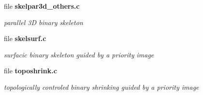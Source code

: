 \begin{CompactItemize}
\item 
file {\bf skelpar3d\_\-others.c}
\begin{CompactList}\small\item\em parallel 3D binary skeleton \item\end{CompactList}

\item 
file {\bf skelsurf.c}
\begin{CompactList}\small\item\em surfacic binary skeleton guided by a priority image \item\end{CompactList}

\item 
file {\bf toposhrink.c}
\begin{CompactList}\small\item\em topologically controled binary shrinking guided by a priority image \item\end{CompactList}

\end{CompactItemize}
